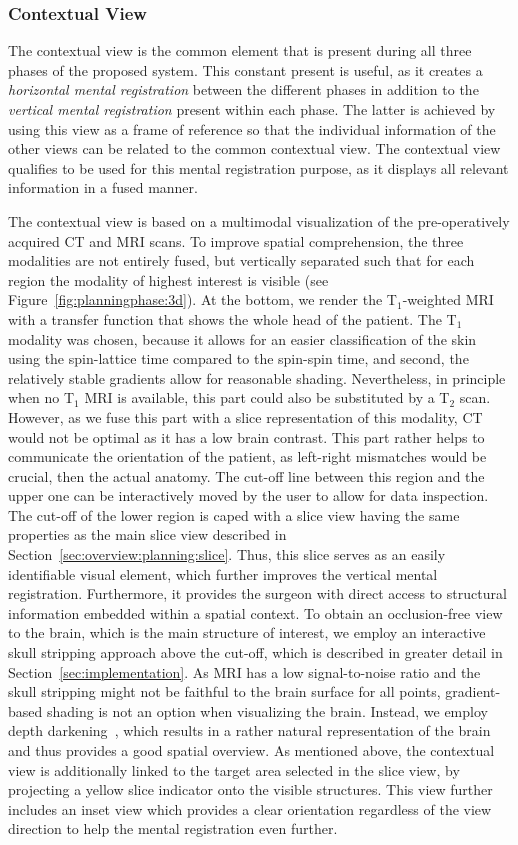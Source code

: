 \documentclass[journal]{vgtc}                %
\begin{document}
\subsubsection{Contextual View}\label{sec:overview:planning:3d}
The contextual view is the common element that is present during all three phases of the proposed system. This constant present is useful, as it creates a \emph{horizontal mental registration} between the different phases in addition to the \emph{vertical mental registration} present within each phase. The latter is achieved by using this view as a frame of reference so that the individual information of the other views can be related to the common contextual view. The contextual view qualifies to be used for this mental registration purpose, as it displays all relevant information in a fused manner.

The contextual view is based on a multimodal visualization of the pre-operatively acquired CT and MRI scans. To improve spatial comprehension, the three modalities are not entirely fused, but vertically separated such that for each region the modality of highest interest is visible (see Figure~\ref{fig:planningphase:3d}). At the bottom, we render the T$_1$-weighted MRI with a transfer function that shows the whole head of the patient. The T$_1$ modality was chosen, because it allows for an easier classification of the skin using the spin-lattice time compared to the spin-spin time, and second, the relatively stable gradients allow for reasonable shading. Nevertheless, in principle when no T$_1$ MRI is available, this part could also be substituted by a T$_2$ scan. However, as we fuse this part with a slice representation of this modality, CT would not be optimal as it has a low brain contrast. This part rather helps to communicate the orientation of the patient, as left-right mismatches would be crucial, then the actual anatomy. The cut-off line between this region and the upper one can be interactively moved by the user to allow for data inspection. The cut-off of the lower region is caped with a slice view having the same properties as the main slice view described in Section~\ref{sec:overview:planning:slice}. Thus, this slice serves as an easily identifiable visual element, which further improves the vertical mental registration. Furthermore, it provides the surgeon with direct access to structural information embedded within a spatial context. To obtain an occlusion-free view to the brain, which is the main structure of interest, we employ an interactive skull stripping approach above the cut-off, which is described in greater detail in Section~\ref{sec:implementation}. As MRI has a low signal-to-noise ratio and the skull stripping might not be faithful to the brain surface for all points, gradient-based shading is not an option when visualizing the brain. Instead, we employ depth darkening~\cite{Luft2005}, which results in a rather natural representation of the brain and thus provides a good spatial overview. As mentioned above, the contextual view is additionally linked to the target area selected in the slice view, by projecting a yellow slice indicator onto the visible structures. This view further includes an inset view which provides a clear orientation regardless of the view direction to help the mental registration even further.
\end{document}
